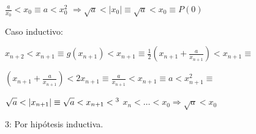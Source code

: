 \hspace{4.5cm}$\displaystyle \frac{a}{x_0} < x_0 \equiv a < x_{0}^2$ $\Rightarrow \sqrt{a} < |x_0| \equiv \sqrt{a} < x_0 \equiv P(0)$

Caso inductivo:
 
\hspace{4cm}$\displaystyle  x_{n+2} < x_{n+1} \equiv g(x_{n+1}) < x_{n+1} \equiv \frac{1}{2}\left(x_{n+1} + \frac{a}{x_{n+1}}\right) < x_{n+1} \equiv $


\hspace{4cm}$\displaystyle  \left(x_{n+1} + \frac{a}{x_{n+1}}\right) < 2x_{n+1} \equiv \frac{a}{x_{n+1}} < x_{n+1} \equiv a < x_{n+1}^2 \equiv $


\hspace{4cm}$\displaystyle  \sqrt{a} < |x_{n+1}| \equiv \sqrt{a} < x_{n+1} <\footnotemark[3]$  $x_n < \ldots < x_0 \Rightarrow \sqrt{a} < x_0$


3: Por hip\'otesis inductiva.
